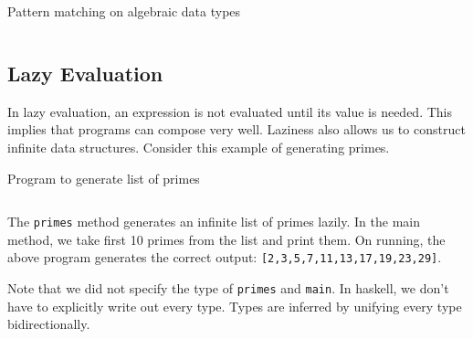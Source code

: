 \begin{program}
  \caption{Pattern matching on algebraic data types}
  \label{prog:shapes}
  \inputminted{haskell}{hs/shapes.hs}
\end{program}

\subsection{Lazy Evaluation}
In lazy evaluation, an expression is not evaluated until its value is needed. This implies that programs can compose very well. Laziness also allows us to construct infinite data structures. Consider this example of generating primes.

\begin{program}
  \caption{Program to generate list of primes}
  \label{prog:list-of-primes}
  \inputminted{haskell}{hs/primes.hs}
\end{program}

The \texttt{primes} method generates an infinite list of primes lazily. In the main method, we take first 10 primes from the list and print them. On running, the above program generates the correct output: \texttt{[2,3,5,7,11,13,17,19,23,29]}.

Note that we did not specify the type of \texttt{primes} and \texttt{main}. In haskell, we don't have to explicitly write out every type. Types are inferred by unifying every type bidirectionally.
